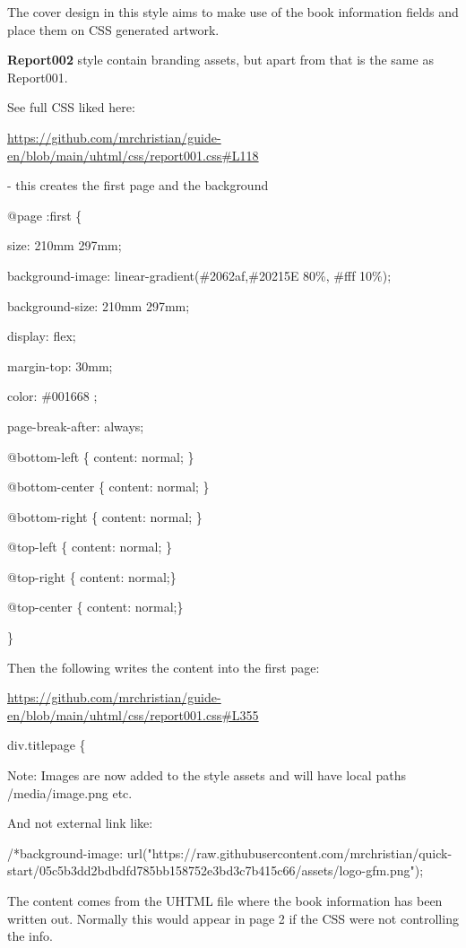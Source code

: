 \documentclass{article}
\begin{document}
The cover design in this style aims to make use of the book information fields and place them on CSS generated artwork.


\textbf{Report002} style contain branding assets, but apart from that is the same as Report001.


See full CSS liked here: 


\href{https://github.com/mrchristian/guide-en/blob/main/uhtml/css/report001.css#L118}{https://github.com/mrchristian/guide-en/blob/main/uhtml/css/report001.css\#L118}


 - this creates the first page and the background


@page :first \{


size: 210mm 297mm;


background-image: linear-gradient(\#2062af,\#20215E 80\%, \#fff 10\%);


background-size: 210mm 297mm;


display: flex;


margin-top: 30mm;


color: \#001668 ;


page-break-after: always;


@bottom-left \{ content: normal; \}


@bottom-center \{ content: normal; \}


@bottom-right \{ content: normal; \}


@top-left \{ content: normal; \}


@top-right \{ content: normal;\}


@top-center \{ content: normal;\}


\}


Then the following writes the content into the first page: 


\href{https://github.com/mrchristian/guide-en/blob/main/uhtml/css/report001.css#L118}{https://github.com/mrchristian/guide-en/blob/main/uhtml/css/report001.css}\href{https://github.com/mrchristian/styles-CSS/blob/main/report001.css#L355}{\#L355} 


div.titlepage \{


Note: Images are now added to the style assets and will have local paths /media/image.png etc.


And not external link like:


/*background-image: url("https://raw.githubusercontent.com/mrchristian/quick-start/05c5b3dd2bdbdfd785bb158752e3bd3c7b415c66/assets/logo-gfm.png");


The content comes from the UHTML file where the book information has been written out. Normally this would appear in page 2 if the CSS were not controlling the info.
\end{document}
